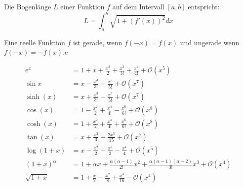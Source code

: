 
Die Bogenlänge $L$ einer Funktion $f$ auf dem Intervall $[a,b]$ entspricht:
$$L = \int_a^b \sqrt{1 + (f'(x))^2}dx$$



Eine reelle Funktion $f$ ist gerade, wenn $f(-x) = f(x)$ und ungerade wenn $f(-x) = -f(x)$.e


\begin{align*}
        \mathrm{e}^x &= 1+x+\frac{x^2}{2}+\frac{x^3}{3!}+\frac{x^4}{4!}+\mathcal{O}(x^5) \\
        \sin{x} &= x-\frac{x^3}{3!}+\frac{x^5}{5!}+\mathcal{O}(x^7) \\
        \sinh(x) &= x+\frac{x^3}{3!}+\frac{x^5}{5!}+\mathcal{O}(x^7) \\
        \cos(x) &= 1-\frac{x^2}{2}+\frac{x^4}{4!}-\frac{x^6}{6!}+\mathcal{O}(x^8) \\
        \cosh(x) &= 1+\frac{x^2}{2}+\frac{x^4}{4!}+\frac{x^6}{6!}+\mathcal{O}(x^8) \\
        \tan(x) &= x+\frac{x^3}{3}+\frac{2x^5}{15}+\mathcal{O}(x^7) \\
        \log(1+x) &= x-\frac{x^2}{2}+\frac{x^3}{3}-\frac{x^4}{4}+\mathcal{O}(x^5) \\
        (1+x)^\alpha &= 1+\alpha x+\frac{\alpha(\alpha-1)}{2!}x^2+ \frac{\alpha(\alpha - 1)(\alpha - 2)}{3!}x^3 + \mathcal{O}(x^4) \\
        \sqrt{1+x} &= 1 + \frac{x}{2} - \frac{x^2}{8} + \frac{x^3}{16} - \mathcal{O}(x^4)
\end{align*}


\vfill\null
\columnbreak



\renewcommand\arraystretch{1.9}

